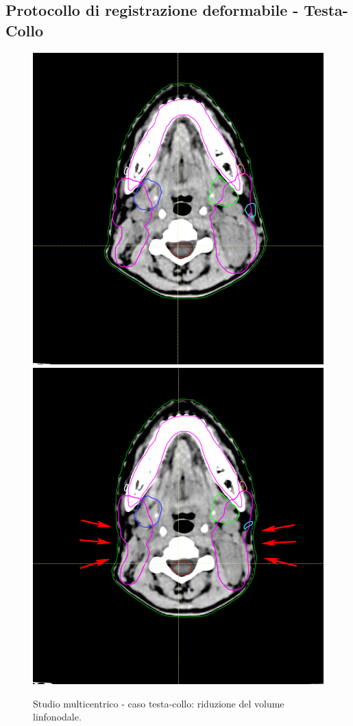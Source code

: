 \subsection{Protocollo di registrazione deformabile - Testa-Collo}

\begin{figure}
\centering
\includegraphics[width=.48\textwidth]{./cap3/YES_HN.png}
\includegraphics[width=.48\textwidth]{./cap3/YES_HN_shrink.png}
\caption{Studio multicentrico - caso testa-collo: riduzione del volume linfonodale.}
\label{fig:YES_HN}
\end{figure}

